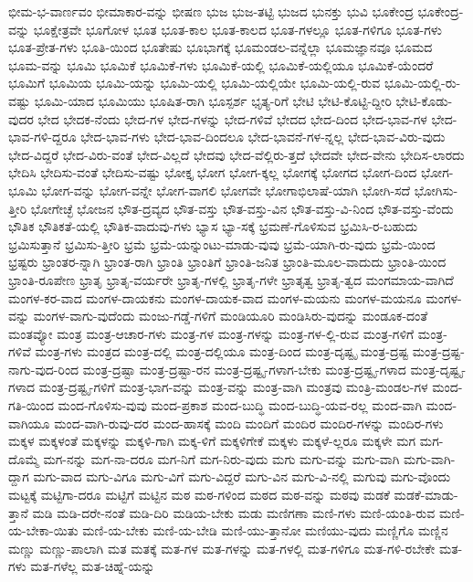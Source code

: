 {ಭೀಮ-ಭ-ವಾರ್ಣವಂ
ಭೀಮಾಕಾರ-ವನ್ನು
ಭೀಷಣ
ಭುಜ
ಭುಜ-ತಟ್ಟಿ
ಭುಜದ
ಭುನಕ್ತು
ಭುವಿ
ಭೂಕೇಂದ್ರ
ಭೂಕೇಂದ್ರ-ವನ್ನು
ಭೂಕ್ಷೇತ್ರವೇ
ಭೂಗೋಳ
ಭೂತ
ಭೂತ-ಕಾಲ
ಭೂತ-ಕಾಲದ
ಭೂತ-ಗಳಲ್ಲೂ
ಭೂತ-ಗಳಿಗೂ
ಭೂತ-ಗಳು
ಭೂತ-ಪ್ರೇತ-ಗಳು
ಭೂತಿ-ಯಿಂದ
ಭೂತೇಷು
ಭೂಭಾಗಕ್ಕೆ
ಭೂಮಂಡಲ-ವನ್ನೆಲ್ಲಾ
ಭೂಮಜ್ಞಾನವೂ
ಭೂಮದ
ಭೂಮ-ವನ್ನು
ಭೂಮಿ
ಭೂಮಿಕೆ
ಭೂಮಿಕೆ-ಗಳು
ಭೂಮಿಕೆ-ಯಲ್ಲಿ
ಭೂಮಿಕೆ-ಯಲ್ಲಿಯೂ
ಭೂಮಿಕೆ-ಯೆಂದರೆ
ಭೂಮಿಗೆ
ಭೂಮಿಯ
ಭೂಮಿ-ಯನ್ನು
ಭೂಮಿ-ಯಲ್ಲಿ
ಭೂಮಿ-ಯಲ್ಲಿಯೇ
ಭೂಮಿ-ಯಲ್ಲಿ-ರುವ
ಭೂಮಿ-ಯಲ್ಲಿ-ರು-ವಷ್ಟು
ಭೂಮಿ-ಯಾದ
ಭೂಮಿಯು
ಭೂಷಿತ-ರಾಗಿ
ಭೂಸ್ಪರ್ಶ
ಭೃತ್ಯ-ರಿಗೆ
ಭೇಟಿ
ಭೇಟಿ-ಕೊಟ್ಟಿ-ದ್ದೀರಿ
ಭೇಟಿ-ಕೊಡು-ವುದರ
ಭೇದ
ಭೇದಕ-ನೆಂದು
ಭೇದ-ಗಳ
ಭೇದ-ಗಳನ್ನು
ಭೇದ-ಗಳಿವೆ
ಭೇದದ
ಭೇದ-ದಿಂದ
ಭೇದ-ಭಾವ-ಗಳ
ಭೇದ-ಭಾವ-ಗಳಿ-ದ್ದರೂ
ಭೇದ-ಭಾವ-ಗಳು
ಭೇದ-ಭಾವ-ದಿಂದಲೂ
ಭೇದ-ಭಾವನೆ-ಗಳ-ನ್ನಲ್ಲ
ಭೇದ-ಭಾವ-ವಿರು-ವುದು
ಭೇದ-ವಿದ್ದರೆ
ಭೇದ-ವಿರು-ವಂತೆ
ಭೇದ-ವಿಲ್ಲದೆ
ಭೇದವು
ಭೇದ-ವೆಲ್ಲಿರು-ತ್ತದೆ
ಭೇದವೇ
ಭೇದ-ವೇನು
ಭೇದಿಸ-ಲಾರದು
ಭೇದಿಸಿ
ಭೇದಿಸು-ವಂತೆ
ಭೇದಿಸು-ವಷ್ಟು
ಭೋಕ್ತೃ
ಭೋಗ
ಭೋಗ-ಕ್ಕಲ್ಲ
ಭೋಗಕ್ಕೆ
ಭೋಗದ
ಭೋಗ-ದಿಂದ
ಭೋಗ-ಭೂಮಿ
ಭೋಗ-ವನ್ನು
ಭೋಗ-ವನ್ನೇ
ಭೋಗ-ವಾಗಲಿ
ಭೋಗವೇ
ಭೋಗಾಭಿಲಾಷೆ-ಯಾಗಿ
ಭೋಗಿ-ಸದೆ
ಭೋಗಿಸು-ತ್ತೀರಿ
ಭೋಗೇಚ್ಛೆ
ಭೋಜನ
ಭೌತ-ದ್ರವ್ಯದ
ಭೌತ-ವಸ್ತು
ಭೌತ-ವಸ್ತು-ವಿನ
ಭೌತ-ವಸ್ತು-ವಿ-ನಿಂದ
ಭೌತ-ವಸ್ತು-ವೆಂದು
ಭೌತಿಕ
ಭೌತಿಕತೆ-ಯಲ್ಲಿ
ಭೌತಿಕ-ವಾದುವು-ಗಳು
ಭ್ಯಾಸ
ಭ್ಯಾ-ಸಕ್ಕೆ
ಭ್ರಮಣೆ-ಗೊಳಿಸುವ
ಭ್ರಮಿಸಿ-ರ-ಬಹುದು
ಭ್ರಮಿಸುತ್ತಾನೆ
ಭ್ರಮಿಸು-ತ್ತೀರಿ
ಭ್ರಮೆ
ಭ್ರಮೆ-ಯನ್ನುಂಟು-ಮಾಡು-ವುವು
ಭ್ರಮೆ-ಯಾಗಿ-ರು-ವುದು
ಭ್ರಮೆ-ಯಿಂದ
ಭ್ರಷ್ಟರು
ಭ್ರಾಂತರ-ನ್ನಾಗಿ
ಭ್ರಾಂತ-ರಾಗಿ
ಭ್ರಾಂತಿ
ಭ್ರಾಂತಿಗೆ
ಭ್ರಾಂತಿ-ಜನಿತ
ಭ್ರಾಂತಿ-ಮೂಲ-ವಾದುದು
ಭ್ರಾಂತಿ-ಯಿಂದ
ಭ್ರಾಂತಿ-ರೂಪೇಣ
ಭ್ರಾತೃ
ಭ್ರಾತೃ-ವರ್ಯರೇ
ಭ್ರಾತೃ-ಗಳಲ್ಲಿ
ಭ್ರಾತೃ-ಗಳೇ
ಭ್ರಾತೃತ್ವ
ಭ್ರಾತೃ-ತ್ವದ
ಮಂಗಮಾಯ-ವಾಗಿದೆ
ಮಂಗಳ-ಕರ-ವಾದ
ಮಂಗಳ-ದಾಯಕನು
ಮಂಗಳ-ದಾಯಕ-ವಾದ
ಮಂಗಳ-ಮಯನು
ಮಂಗಳ-ಮಯನೂ
ಮಂಗಳ-ವನ್ನು
ಮಂಗಳ-ವಾಗು-ವುದೆಂದು
ಮಂಜು-ಗಡ್ಡೆ-ಗಳಿಗೆ
ಮಂಡಿಯೂರಿ
ಮಂಡಿಸಿರು-ವುದನ್ನು
ಮಂಡೂಕ-ದಂತೆ
ಮಂತವ್ಯೋ
ಮಂತ್ರ
ಮಂತ್ರ-ಆಚಾರ-ಗಳು
ಮಂತ್ರ-ಗಳ
ಮಂತ್ರ-ಗಳನ್ನು
ಮಂತ್ರ-ಗಳ-ಲ್ಲಿ-ರುವ
ಮಂತ್ರ-ಗಳಿಗೆ
ಮಂತ್ರ-ಗಳಿವೆ
ಮಂತ್ರ-ಗಳು
ಮಂತ್ರದ
ಮಂತ್ರ-ದಲ್ಲಿ
ಮಂತ್ರ-ದಲ್ಲಿಯೂ
ಮಂತ್ರ-ದಿಂದ
ಮಂತ್ರ-ದೃಷ್ಟೃ
ಮಂತ್ರ-ದ್ರಷ್ಟ
ಮಂತ್ರ-ದ್ರಷ್ಟ-ನಾಗು-ವುದ-ರಿಂದ
ಮಂತ್ರ-ದ್ರಷ್ಟಾ
ಮಂತ್ರ-ದ್ರಷ್ಟಾ-ರನ
ಮಂತ್ರ-ದ್ರಷ್ಟೃ-ಗಳಾಗ-ಬೇಕು
ಮಂತ್ರ-ದ್ರಷ್ಟೃ-ಗಳಾದ
ಮಂತ್ರ-ದೃಷ್ಟೃ-ಗಳಾದ
ಮಂತ್ರ-ದ್ರಷ್ಟೃ-ಗಳಿಗೆ
ಮಂತ್ರ-ಭಾಗ-ವನ್ನು
ಮಂತ್ರ-ವನ್ನು
ಮಂತ್ರ-ವಾಗಿ
ಮಂತ್ರವು
ಮಂತ್ರಿ-ಮಂಡಲ-ಗಳ
ಮಂದ-ಗತಿ-ಯಿಂದ
ಮಂದ-ಗೊಳಿಸು-ವುವು
ಮಂದ-ಪ್ರಕಾಶ
ಮಂದ-ಬುದ್ಧಿ
ಮಂದ-ಬುದ್ಧಿ-ಯವ-ರಲ್ಲ
ಮಂದ-ವಾಗಿ
ಮಂದ-ವಾಗಿಯೂ
ಮಂದ-ವಾಗಿ-ರುವು-ದರ
ಮಂದ-ಹಾಸಕ್ಕೆ
ಮಂದಿ
ಮಂದಿಗೆ
ಮಂದಿರ
ಮಂದಿರ-ಗಳನ್ನು
ಮಂದಿರ-ಗಳು
ಮಕ್ಕಳ
ಮಕ್ಕಳಂತೆ
ಮಕ್ಕಳನ್ನು
ಮಕ್ಕಳಿ-ಗಾಗಿ
ಮಕ್ಕ-ಳಿಗೆ
ಮಕ್ಕಳಿಗೇಕೆ
ಮಕ್ಕಳು
ಮಕ್ಕಳೆ-ಲ್ಲರೂ
ಮಕ್ಕಳೇ
ಮಗ
ಮಗ-ದೊಮ್ಮೆ
ಮಗ-ನನ್ನು
ಮಗ-ನಾ-ದರೂ
ಮಗ-ನಿಗೆ
ಮಗ-ನಿರು-ವುದು
ಮಗು
ಮಗು-ವನ್ನು
ಮಗು-ವಾಗಿ
ಮಗು-ವಾಗಿ-ದ್ದಾಗ
ಮಗು-ವಾದ
ಮಗು-ವಿಗೂ
ಮಗು-ವಿಗೆ
ಮಗು-ವಿದ್ದರೆ
ಮಗು-ವಿನ
ಮಗು-ವಿ-ನಲ್ಲಿ
ಮಗುವು
ಮಗು-ವೊಂದು
ಮಟ್ಟಕ್ಕೆ
ಮಟ್ಟಿಗಾ-ದರೂ
ಮಟ್ಟಿಗೆ
ಮಟ್ಟಿನ
ಮಠ
ಮಠ-ಗಳಿಂದ
ಮಠದ
ಮಠ-ವನ್ನು
ಮಠವು
ಮಡಕೆ
ಮಡಕೆ-ಮಾಡು-ತ್ತಾನೆ
ಮಡಿ
ಮಡಿ-ದರೇ-ನಂತೆ
ಮಡಿ-ದಿರಿ
ಮಡಿಯ-ಬೇಕು
ಮಡು
ಮಣಿಗಣಾ
ಮಣಿ-ಗಳು
ಮಣಿ-ಯಂತಿ-ರುವ
ಮಣಿ-ಯ-ಬೇಕಾ-ಯಿತು
ಮಣಿ-ಯ-ಬೇಕು
ಮಣಿ-ಯ-ಬೇಡಿ
ಮಣಿ-ಯು-ತ್ತಾನೋ
ಮಣಿಯು-ವುದು
ಮಣ್ಣಿಗೊ
ಮಣ್ಣಿನ
ಮಣ್ಣು
ಮಣ್ಣು-ಪಾಲಾಗಿ
ಮತ
ಮತಕ್ಕೆ
ಮತ-ಗಳ
ಮತ-ಗಳನ್ನು
ಮತ-ಗಳಲ್ಲಿ
ಮತ-ಗಳಿಗೂ
ಮತ-ಗಳಿ-ರಬೇಕೇ
ಮತ-ಗಳು
ಮತ-ಗಳೆಲ್ಲ
ಮತ-ಚಿಹ್ನೆ-ಯನ್ನು
}
